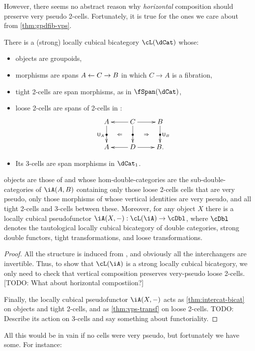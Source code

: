 \documentclass{amsart}
\newcommand{\hunit}[1]{\mathsf{U}_{#1}}
\begin{document}
However, there seems no abstract reason why \emph{horizontal} composition should preserve very pseudo 2-cells.
Fortunately, it is true for the ones we care about from \cref{thm:gpdfib-vps}.

\begin{lem}
  There is a (strong) locally cubical bicategory $\cL(\dCat)$ whose:
  \begin{itemize}
  \item objects are groupoids,
  \item morphisms are spans $A \leftarrow C \to B$ in which $C\to A$ is a fibration,
  \item tight 2-cells are span morphisms, as in $\fSpan(\dCat)$,
  \item loose 2-cells are spans of 2-cells in \dCat:
    \[ \xymatrix{ A \ar[d]|{\bullet}_{\hunit A} \ar@{}[dr]|{\Leftarrow} &
      C \ar[l] \ar[d]|{\bullet} \ar[r] \ar@{}[dr]|{\Rightarrow} &
      B \ar[d]|{\bullet}^{\hunit B}\\
      A & D \ar[l] \ar[r] & B. } \]
  \item Its 3-cells are span morphisms in $\dCat_1$.
  \end{itemize}

  
objects are those of \iA and whose hom-double-categories are the sub-double-categories of $\iA(A,B)$ containing only those loose 2-cells cells that are very pseudo, only those morphisms of \iA whose vertical identities are very pseudo, and all tight 2-cells and 3-cells between these.
  Moreover, for any object $X$ there is a locally cubical pseudofunctor $\iA(X,-):\cL(\iA) \to \cDbl$, where $\cDbl$ denotes the tautological locally cubical bicategory of double categories, strong double functors, tight transformations, and loose transformations.
\end{lem}
\begin{proof}
  All the structure is induced from \iA, and obviously all the interchangers are invertible.
  Thus, to show that $\cL(\iA)$ is a strong locally cubical bicategory, we only need to check that vertical composition preserves very-pseudo loose 2-cells.
  [TODO: What about horizontal compostiion?]

  Finally, the locally cubical pseudofunctor $\iA(X,-)$ acts as \cref{thm:intercat-bicat} on objects and tight 2-cells, and as \cref{thm:vps-transf} on loose 2-cells.
  TODO: Describe its action on 3-cells and say something about functoriality.
\end{proof}

All this would be in vain if no cells were very pseudo, but fortunately we have some.
For instance:
\end{document}
